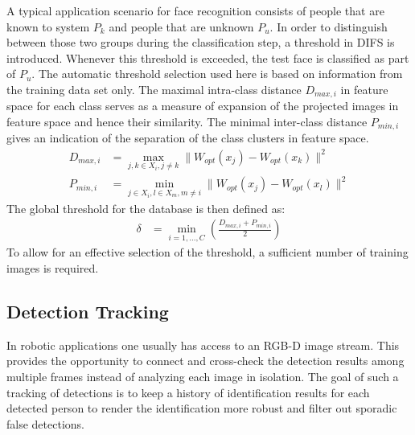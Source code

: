 A typical application scenario for face recognition consists of people that are known to system $P_{k}$ and people that are unknown $P_{u}$.
In order to distinguish between those two groups during the classification step, a threshold in DIFS is introduced.
Whenever this threshold is exceeded, the test face is classified as part of $P_u$.
The automatic threshold selection used here is based on information from the training data set only.
The maximal intra-class distance $D_{max,i}$ in feature space for each class serves as a measure of expansion of the projected images in feature space and hence their similarity.
The minimal inter-class distance $P_{min,i}$ gives an indication of the separation of the class clusters in feature space.
\begin{align}
    D_{max,i} & =\max_{j,k \in X_i , j \neq k}\|W_{opt}(x_{j})-W_{opt}(x_{k})\|^2  \\
    P_{min,i} & =\min_{j \in X_i ,l \in X_m, m \neq i}\|W_{opt}(x_{j})-W_{opt}(x_{l})\|^2
\end{align}
The global threshold for the database is then defined as:
\begin{align}
   \delta & = \min_{i=1,\ldots,C}\left(\frac{D_{max,i}+P_{min,i}}{2}\right)
\end{align}
To allow for an effective selection of the threshold, a sufficient number of training images is required.

\subsection{Detection Tracking}
\label{sec:methods:subsec:tracking}

In robotic applications one usually has access to an RGB-D image stream. This provides the opportunity to connect and cross-check the detection results among multiple frames instead of analyzing each image in isolation. The goal of such a tracking of detections is to keep a history of identification results for each detected person to render the identification more robust and filter out sporadic false detections. %

